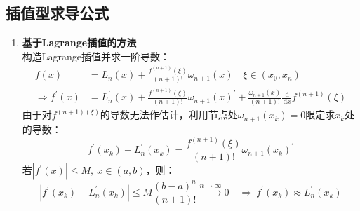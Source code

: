 \subsection{插值型求导公式}
\begin{enumerate}
    \item \textbf{基于Lagrange插值的方法}\\
        构造Lagrange插值并求一阶导数：
        \begin{align*}
            f(x) &= L_n(x) + \frac{f^{(n+1)}(\xi)}{(n+1)!}\omega_{n+1}(x) \quad \xi \in (x_0,x_n) \\[3mm]
            \Rightarrow f^{\prime}(x) &= L_n^{\prime}(x) +  \frac{f^{(n+1)}(\xi)}{(n+1)!}\omega_{n+1}(x)^{\prime} +  \frac{\omega_{n+1}(x)}{(n+1)!}\frac{\,\mathrm{d}}{\,\mathrm{d}x}f^{(n+1)}(\xi)
        \end{align*}
        由于对$f^{(n+1)(\xi)}$的导数无法作估计，利用节点处$\omega_{n+1}(x_k)=0$限定求$x_k$处的导数：
        \begin{equation}
            f^{\prime}(x_k) - L_n^{\prime}(x_k) = \frac{f^{(n+1)}(\xi)}{(n+1)!}\omega_{n+1}(x_k)^{\prime}
        \end{equation}
        若$\left| f^{\prime}(x) \right| \leqslant M,\ x\in(a,b)$，则：
        \begin{equation*}
            \left| f^{\prime}(x_k) - L_n^{\prime}(x_k) \right| \leqslant M \frac{(b-a)^n}{(n+1)!} \overset{n\rightarrow \infty}{\longrightarrow} 0 \quad \Rightarrow \ f^{\prime}(x_k) \approx L_n^{\prime}(x_k)
        \end{equation*}
        \newpage


\end{enumerate}
